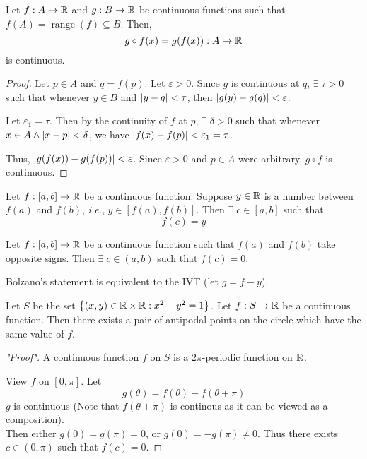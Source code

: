 \documentclass[12pt]{article}
\begin{document}
\begin{thm} \label{thm:compositions}
    Let $f: A \to \mathbb{R}$ and $g: B \to \mathbb{R}$ be continuous functions such that $f(A) = \mathop{range}(f) \subseteq B$. Then, \[
        g \circ f(x) = g(f(x)) : A \to \mathbb{R}
    \] is continuous.
\end{thm}

\begin{proof}
    Let $p \in A$ and $q = f(p)$. Let $\varepsilon > 0$. Since $g$ is continuous at $q$, $\exists\; \tau > 0$ such that whenever $y \in B$ and $\abs{ y - q } < \tau$, then $\abs{ g(y) - g(q) } < \varepsilon$.

    Let $\varepsilon_{1} = \tau$. Then by the continuity of $f$ at $p$, $\exists\; \delta > 0$ such that whenever $x \in A \land \abs{ x - p } < \delta$, we have $\abs{ f(x) - f(p) } < \varepsilon_{1} = \tau$.

    Thus, $\abs{ g(f(x)) - g(f(p)) } < \varepsilon$. Since $\varepsilon > 0$ and $p \in A$ were arbitrary, $g \circ f$ is continuous.
\end{proof}

\begin{thm} \label{thm:intermediate value}
    Let $f: [a, b] \to \mathbb{R}$ be a continuous function. Suppose $y \in \mathbb{R}$ is a number between $f(a)$ and $f(b)$, \textit{i.e.}, $y \in [f(a), f(b)]$. Then $\exists\; c \in [a, b]$ such that \[
        f(c) = y
    \]
\end{thm}
\begin{cor}[Bolzano] \label{cor:bolzano}
    Let $f : [a, b] \to \mathbb{R}$ be a continuous function such that $f(a)$ and $f(b)$ take opposite signs. Then $\exists\; c \in (a, b)$ such that $f(c) = 0$.
\end{cor}
\begin{rem}
    Bolzano's statement is equivalent to the IVT (let $g = f - y$).
\end{rem}

\begin{thm} \label{thm:borsuk-ulam}
    Let $S$ be the set $\set{(x, y) \in \R \times \R : x^{2} + y^{2} = 1}$. Let $f: S \to \mathbb{R}$ be a continuous function. Then there exists a pair of antipodal points on the circle which have the same value of $f$.
\end{thm}

\begin{proof}["Proof"]
    A continuous function $f$ on $S$ is a $2\pi$-periodic function on $\mathbb{R}$.
    
    View $f$ on $[0, \pi]$. Let \[
        g(\theta) = f(\theta) - f(\theta + \pi)
    \] $g$ is continuous (Note that $f(\theta + \pi)$ is continous as it can be viewed as a composition). \\
    Then either $g(0) = g(\pi) = 0$, or $g(0) = -g(\pi) \neq 0$. Thus there exists $c \in (0, \pi)$ such that $f(c) = 0$.
\end{proof}
\end{document}
